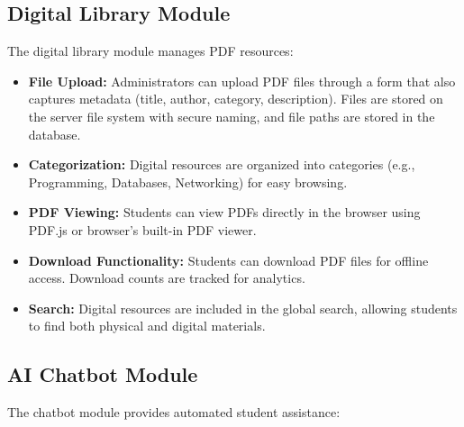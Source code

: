 \documentclass[12pt,a4paper]{report}
\begin{document}
\subsection{Digital Library Module}

The digital library module manages PDF resources:

\begin{itemize}
    \item \textbf{File Upload:} Administrators can upload PDF files through a form that also captures metadata (title, author, category, description). Files are stored on the server file system with secure naming, and file paths are stored in the database.
    
    \item \textbf{Categorization:} Digital resources are organized into categories (e.g., Programming, Databases, Networking) for easy browsing.
    
    \item \textbf{PDF Viewing:} Students can view PDFs directly in the browser using PDF.js or browser's built-in PDF viewer.
    
    \item \textbf{Download Functionality:} Students can download PDF files for offline access. Download counts are tracked for analytics.
    
    \item \textbf{Search:} Digital resources are included in the global search, allowing students to find both physical and digital materials.
\end{itemize}

\subsection{AI Chatbot Module}

The chatbot module provides automated student assistance:
\end{document}
